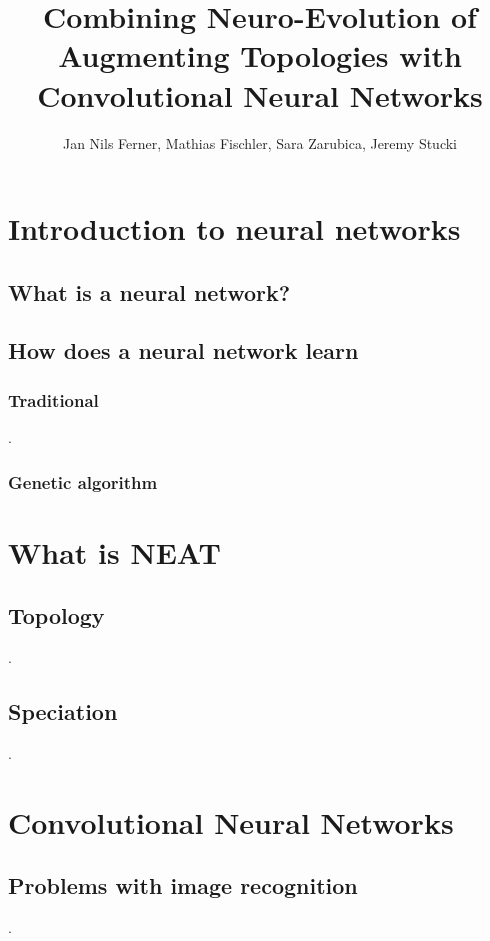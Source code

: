 \documentclass[11pt]{article}
\title{Combining Neuro-Evolution of Augmenting Topologies with Convolutional Neural Networks}
\author{Jan Nils Ferner, Mathias Fischler, Sara Zarubica, Jeremy Stucki}
\begin{document}
\maketitle
\newpage

\begin{abstract}

	\newpage

\end{abstract}

	\tableofcontents
	\newpage

	\section{Introduction to neural networks}
		\subsection{What is a neural network?}
			
		\subsection{How does a neural network learn}
			\subsubsection{Traditional}
				.
			\subsubsection{Genetic algorithm}
				
	\newpage

	\section{What is NEAT}
		\subsection{Topology}
			.
		\subsection{Speciation}
			.
	\newpage

	\section{Convolutional Neural Networks}
		\subsection{Problems with image recognition}
			.
\end{document}
